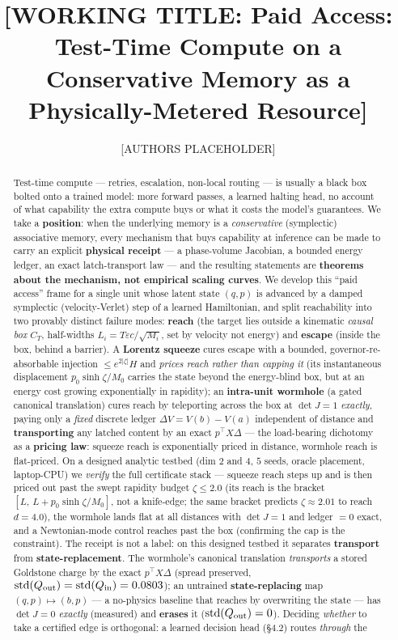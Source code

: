 \documentclass[11pt]{article}
\title{\textbf{[WORKING TITLE: Paid Access: Test-Time Compute on a\\ Conservative Memory as a Physically-Metered Resource]}}
\author{[AUTHORS PLACEHOLDER]}
\date{}
\newcommand{\detJ}{\det J}
\begin{document}
\sloppy
\maketitle

\begin{abstract}
Test-time compute --- retries, escalation, non-local routing --- is usually a black box bolted onto a trained model: more forward passes, a learned halting head, no account of what capability the extra compute buys or what it costs the model's guarantees. We take a \textbf{position}: when the underlying memory is a \emph{conservative} (symplectic) associative memory, every mechanism that buys capability at inference can be made to carry an explicit \textbf{physical receipt} --- a phase-volume Jacobian, a bounded energy ledger, an exact latch-transport law --- and the resulting statements are \textbf{theorems about the mechanism, not empirical scaling curves}. We develop this ``paid access'' frame for a single unit whose latent state $(q,p)$ is advanced by a damped symplectic (velocity-Verlet) step of a learned Hamiltonian, and split reachability into two provably distinct failure modes: \textbf{reach} (the target lies outside a kinematic \emph{causal box} $C_T$, half-widths $L_i=T\varepsilon c/\sqrt{M_i}$, set by velocity not energy) and \textbf{escape} (inside the box, behind a barrier). A \textbf{Lorentz squeeze} cures escape with a bounded, governor-re-absorbable injection $\le e^{2|\zeta|}H$ and \emph{prices reach rather than capping it} (its instantaneous displacement $p_0\sinh\zeta/M_0$ carries the state beyond the energy-blind box, but at an energy cost growing exponentially in rapidity); an \textbf{intra-unit wormhole} (a gated canonical translation) cures reach by teleporting across the box at $\detJ=1$ \emph{exactly}, paying only a \emph{fixed} discrete ledger $\Delta V=V(b)-V(a)$ independent of distance and \textbf{transporting} any latched content by an exact $p^\top X\Delta$ --- the load-bearing dichotomy as a \textbf{pricing law}: squeeze reach is exponentially priced in distance, wormhole reach is flat-priced. On a designed analytic testbed (dim $2$ and $4$, $5$ seeds, oracle placement, laptop-CPU) we \emph{verify} the full certificate stack --- squeeze reach steps up and is then priced out past the swept rapidity budget $\zeta\le2.0$ (its reach is the bracket $[L,\,L+p_0\sinh\zeta/M_0]$, not a knife-edge; the same bracket predicts $\zeta\approx2.01$ to reach $d=4.0$), the wormhole lands flat at all distances with $\detJ=1$ and ledger $=0$ exact, and a Newtonian-mode control reaches past the box (confirming the cap is the constraint). The receipt is not a label: on this designed testbed it separates \textbf{transport} from \textbf{state-replacement}. The wormhole's canonical translation \emph{transports} a stored Goldstone charge by the exact $p^\top X\Delta$ (spread preserved, $\mathrm{std}(Q_{\rm out})=\mathrm{std}(Q_{\rm in})=0.0803$); an untrained \textbf{state-replacing} map $(q,p)\mapsto(b,p)$ --- a no-physics baseline that reaches by overwriting the state --- has $\detJ=0$ \emph{exactly} (measured) and \textbf{erases} it ($\mathrm{std}(Q_{\rm out})=0$). Deciding \emph{whether} to take a certified edge is orthogonal: a learned decision head (\S4.2) routes \emph{through} the 
\end{abstract}
\end{document}
